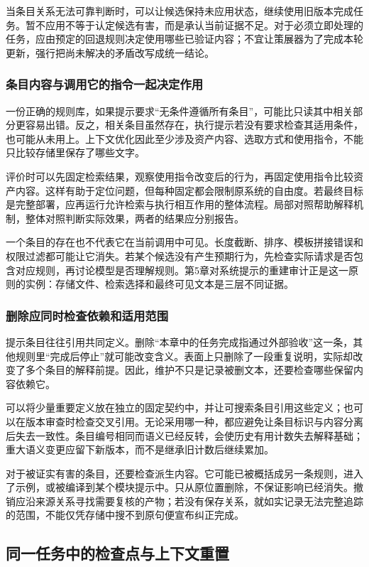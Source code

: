 当条目关系无法可靠判断时，可以让候选保持未应用状态，继续使用旧版本完成任务。暂不应用不等于认定候选有害，而是承认当前证据不足。对于必须立即处理的任务，应由预定的回退规则决定使用哪些已验证内容；不宜让策展器为了完成本轮更新，强行把尚未解决的矛盾改写成统一结论。

\subsubsection{条目内容与调用它的指令一起决定作用}

一份正确的规则库，如果提示要求“无条件遵循所有条目”，可能比只读其中相关部分更容易出错。反之，相关条目虽然存在，执行提示若没有要求检查其适用条件，也可能从未用上。上下文优化因此至少涉及资产内容、选取方式和使用指令，不能只比较存储里保存了哪些文字。

评价时可以先固定检索结果，观察使用指令改变后的行为，再固定使用指令比较资产内容。这样有助于定位问题，但每种固定都会限制原系统的自由度。若最终目标是完整部署，应再运行允许检索与执行相互作用的整体流程。局部对照帮助解释机制，整体对照判断实际效果，两者的结果应分别报告。

一个条目的存在也不代表它在当前调用中可见。长度截断、排序、模板拼接错误和权限过滤都可能让它消失。若某个候选没有产生预期行为，先检查实际请求是否包含对应规则，再讨论模型是否理解规则。第5章对系统提示的重建审计正是这一原则的实例：存储文件、检索选择和最终可见文本是三层不同证据。

\subsubsection{删除应同时检查依赖和适用范围}

提示条目往往引用共同定义。删除“本章中的任务完成指通过外部验收”这一条，其他规则里“完成后停止”就可能改变含义。表面上只删除了一段重复说明，实际却改变了多个条目的解释前提。因此，维护不只是记录被删文本，还要检查哪些保留内容依赖它。

可以将少量重要定义放在独立的固定契约中，并让可搜索条目引用这些定义；也可以在版本审查时检查交叉引用。无论采用哪一种，都应避免让条目标识与内容分离后失去一致性。条目编号相同而语义已经反转，会使历史有用计数失去解释基础；重大语义变更应留下新版本，而不是继承旧计数后继续累加。

对于被证实有害的条目，还要检查派生内容。它可能已被概括成另一条规则，进入了示例，或被编译到某个模块提示中。只从原位置删除，不保证影响已经消失。撤销应沿来源关系寻找需要复核的产物；若没有保存关系，就如实记录无法完整追踪的范围，不能仅凭存储中搜不到原句便宣布纠正完成。

\subsection{同一任务中的检查点与上下文重置}
\label{sec:ch07-coral}

